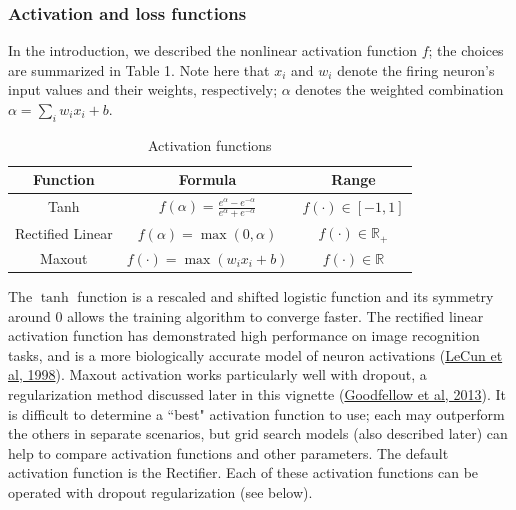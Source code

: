 \subsubsection{Activation and loss functions} \label{sssec:ActivationLoss}
In the introduction, we described the nonlinear activation function $f$; the choices are summarized in Table 1. Note here that $x_i$ and $w_i$ denote the firing neuron's input values and their weights, respectively; $\alpha$ denotes the weighted combination $\alpha = \sum_i w_i x_i+b$.
\begin{table}[ht] 
\caption{Activation functions }
\centering %
\begin{tabular}{c c c} %
\hline\hline %
Function & Formula & Range \\ [0.5ex] %
\hline %
Tanh & $f(\alpha) = \frac{e^{\alpha} - e ^{-\alpha}}{e^\alpha + e ^{-\alpha}}$ & $f(\cdot) \in [-1,1]$ \\ %
Rectified Linear & $f(\alpha) = \max(0,\alpha)$ & $f(\cdot) \in \mathbb{R}_+$ \\
Maxout & $f(\cdot) = \max(w_i x_i + b) $ & $f(\cdot) \in \mathbb{R}$\\  %
\hline %
\end{tabular} 
\label{table:nonlin} %
\end{table}
The $\tanh$ function is a rescaled and shifted logistic function and its symmetry around 0 allows the training algorithm to converge faster. The rectified linear activation function has demonstrated high performance on image recognition tasks, and is a more biologically accurate model of neuron activations (\href{http://yann.lecun.com/exdb/publis/pdf/lecun-98b.pdf}{LeCun et al, 1998}).  Maxout activation works particularly well with dropout, a regularization method discussed later in this vignette (\href{http://arxiv.org/pdf/1302.4389.pdf}{Goodfellow et al, 2013}). 
It is difficult to determine a ``best" activation function to use; each may outperform the others in separate scenarios, but grid search models (also described later) can help to compare activation functions and other parameters. The default activation function is the Rectifier. Each of these activation functions can be operated with dropout regularization (see below).

